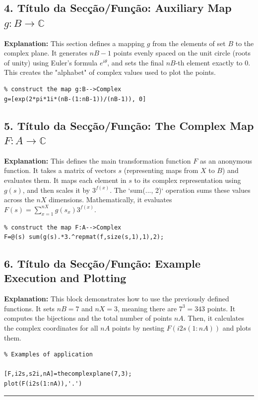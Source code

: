 \subsection{4. Título da Secção/Função: Auxiliary Map $g: B \to \mathbb{C}$}
\textbf{Explanation:} This section defines a mapping $g$ from the elements of set $B$ to the complex plane. It generates $nB-1$ points evenly spaced on the unit circle (roots of unity) using Euler's formula $e^{i\theta}$, and sets the final $nB$-th element exactly to $0$. This creates the "alphabet" of complex values used to plot the points.
\begin{lstlisting}
% construct the map g:B-->Complex
g=[exp(2*pi*1i*(nB-(1:nB-1))/(nB-1)), 0]
\end{lstlisting}


\subsection{5. Título da Secção/Função: The Complex Map $F: A \to \mathbb{C}$}
\textbf{Explanation:} This defines the main transformation function $F$ as an anonymous function. It takes a matrix of vectors $s$ (representing maps from $X$ to $B$) and evaluates them. It maps each element in $s$ to its complex representation using $g(s)$, and then scales it by $3^{f(x)}$. The `sum(..., 2)` operation sums these values across the $nX$ dimensions. Mathematically, it evaluates $F(s) = \sum_{x=1}^{nX} g(s_x) 3^{f(x)}$.
\begin{lstlisting}
% construct the map F:A-->Complex
F=@(s) sum(g(s).*3.^repmat(f,size(s,1),1),2);
\end{lstlisting}


\subsection{6. Título da Secção/Função: Example Execution and Plotting}
\textbf{Explanation:} This block demonstrates how to use the previously defined functions. It sets $nB = 7$ and $nX = 3$, meaning there are $7^3 = 343$ points. It computes the bijections and the total number of points $nA$. Then, it calculates the complex coordinates for all $nA$ points by nesting $F(i2s(1:nA))$ and plots them.
\begin{lstlisting}
% Examples of application

[F,i2s,s2i,nA]=thecomplexplane(7,3);
plot(F(i2s(1:nA)),'.')
\end{lstlisting}

\vspace{0.5cm}
\hrule
\vspace{0.5cm}

